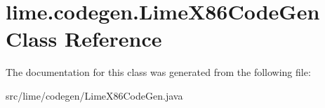 \hypertarget{classlime_1_1codegen_1_1LimeX86CodeGen}{}\section{lime.\+codegen.\+Lime\+X86\+Code\+Gen Class Reference}
\label{classlime_1_1codegen_1_1LimeX86CodeGen}


The documentation for this class was generated from the following file\+:\begin{DoxyCompactItemize}
\item 
src/lime/codegen/Lime\+X86\+Code\+Gen.\+java\end{DoxyCompactItemize}
